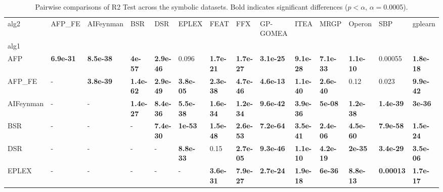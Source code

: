 \begin{table}
\centering
\tiny
\caption{Pairwise comparisons of R2 Test across the symbolic datasets. Bold indicates significant differences ($p<\alpha$, $\alpha=$0.0005).}
\begin{tabular}{llllllllllllll}
\toprule
alg2 &           AFP\_FE &        AIFeynman &              BSR &              DSR &            EPLEX &             FEAT &              FFX &         GP-GOMEA &             ITEA &             MRGP &           Operon &              SBP &          gplearn \\
alg1      &                  &                  &                  &                  &                  &                  &                  &                  &                  &                  &                  &                  &                  \\
\midrule
AFP       &  \textbf{6.9e-31} &  \textbf{8.5e-38} &    \textbf{4e-57} &  \textbf{2.9e-46} &            0.096 &  \textbf{1.7e-21} &  \textbf{1.7e-27} &  \textbf{3.1e-25} &  \textbf{9.1e-28} &  \textbf{7.1e-33} &  \textbf{1.1e-10} &          0.00055 &  \textbf{1.8e-18} \\
AFP\_FE    &                - &  \textbf{3.8e-39} &  \textbf{1.4e-62} &  \textbf{2.9e-49} &  \textbf{3.8e-05} &  \textbf{2.3e-38} &  \textbf{4.7e-46} &  \textbf{4.6e-13} &  \textbf{1.1e-40} &  \textbf{2.6e-40} &             0.12 &            0.023 &  \textbf{9.9e-42} \\
AIFeynman &                - &                - &  \textbf{1.4e-27} &  \textbf{8.4e-36} &  \textbf{5.5e-38} &  \textbf{1.6e-34} &  \textbf{1.2e-34} &  \textbf{9.6e-42} &  \textbf{3.9e-36} &    \textbf{5e-08} &  \textbf{1.2e-38} &  \textbf{1.4e-39} &    \textbf{3e-36} \\
BSR       &                - &                - &                - &  \textbf{7.4e-30} &    \textbf{1e-53} &  \textbf{1.5e-48} &  \textbf{2.6e-53} &  \textbf{7.2e-64} &  \textbf{3.5e-41} &  \textbf{2.4e-06} &  \textbf{4.5e-60} &  \textbf{7.9e-58} &  \textbf{1.5e-24} \\
DSR       &                - &                - &                - &                - &  \textbf{8.8e-33} &             0.15 &  \textbf{2.7e-05} &  \textbf{9.3e-46} &  \textbf{1.1e-10} &  \textbf{4.2e-19} &    \textbf{2e-35} &  \textbf{3.4e-29} &  \textbf{3.5e-06} \\
EPLEX     &                - &                - &                - &                - &                - &  \textbf{3.6e-31} &  \textbf{7.9e-27} &  \textbf{2.7e-24} &  \textbf{1.9e-18} &    \textbf{6e-36} &  \textbf{8.8e-13} &  \textbf{0.00013} &  \textbf{1.7e-17} \\

\end{tabular}
\end{table}
